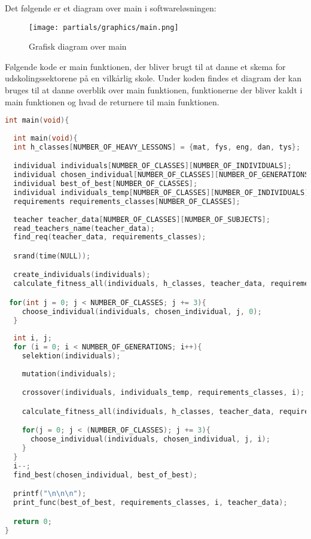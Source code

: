 Det følgende er et diagram over main i softwareløsningen:
\begin{figure}[!h]
\texttt{[image: partials/graphics/main.png]}
\caption{Grafisk diagram over main}
\label{fig:diagrammain}
\end{figure}

Følgende kode er main funktionen, der bliver brugt til at danne et skema for udskolingssektorene på en vilkårlig skole. Under koden findes et diagram der kan bruges til at danne overblik over main funktionen, funktionerne der bliver kaldt i main funktionen og hvad de returnere til main funktionen. 
\begin{lstlisting}[showstringspaces=false,language = c]
int main(void){
  
  int main(void){
  int h_classes[NUMBER_OF_HEAVY_LESSONS] = {mat, fys, eng, dan, tys};

  individual individuals[NUMBER_OF_CLASSES][NUMBER_OF_INDIVIDUALS];
  individual chosen_individual[NUMBER_OF_CLASSES][NUMBER_OF_GENERATIONS];
  individual best_of_best[NUMBER_OF_CLASSES];
  individual individuals_temp[NUMBER_OF_CLASSES][NUMBER_OF_INDIVIDUALS];
  requirements requirements_classes[NUMBER_OF_CLASSES];
  
  teacher teacher_data[NUMBER_OF_CLASSES][NUMBER_OF_SUBJECTS];
  read_teachers_name(teacher_data);
  find_req(teacher_data, requirements_classes);

  srand(time(NULL));

  create_individuals(individuals);
  calculate_fitness_all(individuals, h_classes, teacher_data, requirements_classes);

 for(int j = 0; j < NUMBER_OF_CLASSES; j += 3){
    choose_individual(individuals, chosen_individual, j, 0);
  }
 
  int i, j;
  for (i = 0; i < NUMBER_OF_GENERATIONS; i++){
    selektion(individuals);
    
    mutation(individuals);

    crossover(individuals, individuals_temp, requirements_classes, i);

    calculate_fitness_all(individuals, h_classes, teacher_data, requirements_classes);

    for(j = 0; j < (NUMBER_OF_CLASSES); j += 3){
      choose_individual(individuals, chosen_individual, j, i);  
    }
  }
  i--;
  find_best(chosen_individual, best_of_best);

  printf("\n\n\n");
  print_func(best_of_best, requirements_classes, i, teacher_data);

  return 0;
}
\end{lstlisting}

